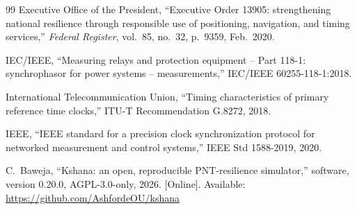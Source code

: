 \documentclass[conference]{IEEEtran}
\begin{document}
\begin{thebibliography}{99}
 Executive Office of the President, ``Executive Order 13905:
strengthening national resilience through responsible use of positioning,
navigation, and timing services,'' \emph{Federal Register}, vol.~85, no.~32,
p.~9359, Feb.~2020.

 IEC/IEEE, ``Measuring relays and protection equipment --
Part 118-1: synchrophasor for power systems -- measurements,''
IEC/IEEE 60255-118-1:2018.

 International Telecommunication Union, ``Timing characteristics of
primary reference time clocks,'' ITU-T Recommendation G.8272, 2018.

 IEEE, ``IEEE standard for a precision clock synchronization protocol
for networked measurement and control systems,'' IEEE Std 1588-2019, 2020.

 C.~Baweja, ``Kshana: an open, reproducible PNT-resilience
simulator,'' software, version 0.20.0, AGPL-3.0-only, 2026. [Online]. Available:
\url{https://github.com/AshfordeOU/kshana}
\end{thebibliography}
\end{document}
